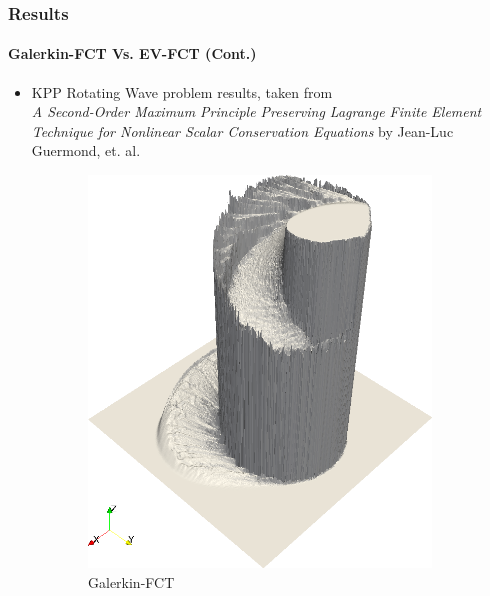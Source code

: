 \documentclass{beamer}
\begin{document}
\begin{frame}
\frametitle{Results}
\framesubtitle{Galerkin-FCT Vs. EV-FCT (Cont.)}

\begin{itemize}
  \item KPP Rotating Wave problem results, taken from\\
    {\small
    \emph{A Second-Order Maximum Principle Preserving
      Lagrange Finite Element Technique for Nonlinear
      Scalar Conservation Equations} by Jean-Luc Guermond, et. al.
      \cite{guermond_secondorder}
    }
\end{itemize}

\begin{figure}[h]
   \centering
   \begin{subfigure}{0.4\textwidth}
      \includegraphics[width=\textwidth]{./figures/Gal-FCT_rotation.png}
      \caption{Galerkin-FCT}
   \end{subfigure}
   \begin{subfigure}{0.4\textwidth}

\end{subfigure}
\end{figure}
\end{frame}
\end{document}

